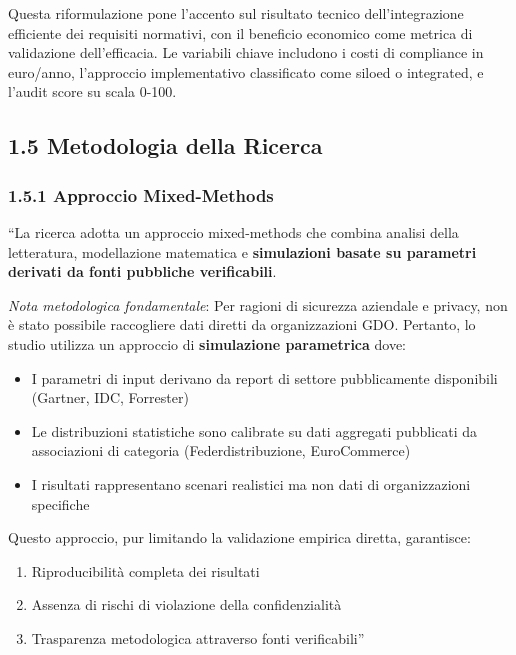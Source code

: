 \documentclass{report}
\begin{document}
Questa riformulazione pone l'accento sul risultato tecnico
dell'integrazione efficiente dei requisiti normativi, con il beneficio
economico come metrica di validazione dell'efficacia. Le variabili
chiave includono i costi di compliance in euro/anno, l'approccio
implementativo classificato come siloed o integrated, e l'audit score su
scala 0-100.

\subsection{\texorpdfstring{\textbf{1.5 Metodologia della
Ricerca}}{1.5 Metodologia della Ricerca}}\label{metodologia-della-ricerca}

\subsubsection{\texorpdfstring{\textbf{1.5.1 Approccio
Mixed-Methods}}{1.5.1 Approccio Mixed-Methods}}\label{approccio-mixed-methods}

``La ricerca adotta un approccio mixed-methods che combina analisi della
letteratura, modellazione matematica e \textbf{simulazioni basate su
parametri derivati da fonti pubbliche verificabili}.

\emph{Nota metodologica fondamentale}: Per ragioni di sicurezza
aziendale e privacy, non è stato possibile raccogliere dati diretti da
organizzazioni GDO. Pertanto, lo studio utilizza un approccio di
\textbf{simulazione parametrica} dove:

\begin{itemize}
\tightlist
\item
  I parametri di input derivano da report di settore pubblicamente
  disponibili (Gartner, IDC, Forrester)\\
\item
  Le distribuzioni statistiche sono calibrate su dati aggregati
  pubblicati da associazioni di categoria (Federdistribuzione,
  EuroCommerce)\\
\item
  I risultati rappresentano scenari realistici ma non dati di
  organizzazioni specifiche
\end{itemize}

Questo approccio, pur limitando la validazione empirica diretta,
garantisce:

\begin{enumerate}
\def\labelenumi{\arabic{enumi}.}
\tightlist
\item
  Riproducibilità completa dei risultati\\
\item
  Assenza di rischi di violazione della confidenzialità\\
\item
  Trasparenza metodologica attraverso fonti verificabili''
\end{enumerate}
\end{document}
